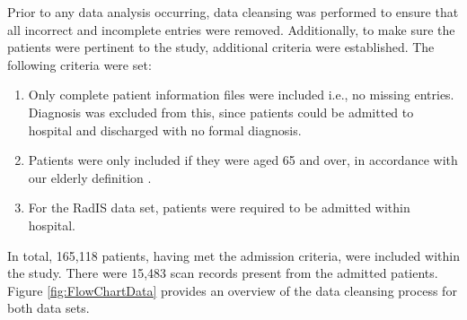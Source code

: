 \documentclass[../thesis.tex]{subfiles}
\begin{document}
Prior to any data analysis occurring, data cleansing was performed to ensure that all incorrect and incomplete entries were removed. Additionally, to make sure the patients were pertinent to the study, additional criteria were established. The following criteria were set:
\begin{enumerate}
    \item Only complete patient information files were included i.e., no missing entries. Diagnosis was excluded from this, since patients could be admitted to hospital and discharged with no formal diagnosis.
    \item Patients were only included if they were aged 65 and over, in accordance with our elderly definition \cite{OECD}.
    \item For the RadIS data set, patients were required to be admitted within hospital.
\end{enumerate}

In total, 165,118 patients, having met the admission criteria, were included within the study. There were 15,483 scan records present from the admitted patients. Figure \ref{fig:FlowChartData} provides an overview of the data cleansing process for both data sets.
\end{document}
